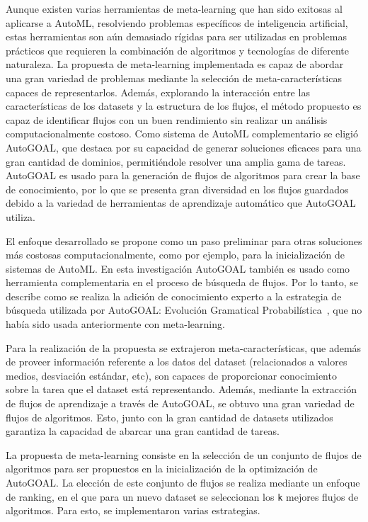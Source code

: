 \begin{conclusions}
Aunque existen varias herramientas de meta-learning que han sido exitosas al aplicarse a AutoML, resolviendo problemas específicos de inteligencia artificial, estas herramientas son aún demasiado rígidas para ser utilizadas en problemas prácticos que requieren la combinación de algoritmos y tecnologías de diferente naturaleza. La propuesta de meta-learning implementada es capaz de abordar una gran variedad de problemas mediante la selección de meta-características capaces de representarlos. Además, explorando la interacción entre las características de los datasets y la estructura de los flujos, el método propuesto es capaz de identificar flujos con un buen rendimiento sin realizar un análisis computacionalmente costoso. Como sistema de AutoML complementario se eligió AutoGOAL, que destaca por su capacidad de generar soluciones eficaces para una gran cantidad de dominios, permitiéndole resolver una amplia gama de tareas. AutoGOAL es usado para la generación de flujos de algoritmos para crear la base de conocimiento, por lo que se presenta gran diversidad en los flujos guardados debido a la variedad de herramientas de aprendizaje automático que AutoGOAL utiliza.

El enfoque desarrollado se propone como un paso preliminar para otras soluciones más costosas computacionalmente, como por ejemplo, para la inicialización de sistemas de AutoML. En esta investigación AutoGOAL también es usado como herramienta complementaria en el proceso de búsqueda de flujos. Por lo tanto, se describe como se realiza la adición de conocimiento experto a la estrategia de búsqueda utilizada por AutoGOAL: Evolución Gramatical Probabilística~\cite{pge2015}, que no había sido usada anteriormente con meta-learning.

Para la realización de la propuesta se extrajeron meta-características, que además de proveer información referente a los datos del dataset (relacionados a valores medios, desviación estándar, etc), son capaces de proporcionar conocimiento sobre la tarea que el dataset está representando. Además, mediante la extracción de flujos de aprendizaje a través de AutoGOAL, se obtuvo una gran variedad de flujos de algoritmos. Esto, junto con la gran cantidad de datasets utilizados garantiza la capacidad de abarcar una gran cantidad de tareas.

La propuesta de meta-learning consiste en la selección de un conjunto de flujos de algoritmos para ser propuestos en la inicialización de la optimización de AutoGOAL. La elección de este conjunto de flujos se realiza mediante un enfoque de ranking, en el que para un nuevo dataset se seleccionan los \texttt{k} mejores flujos de algoritmos. Para esto, se implementaron varias estrategias.


\end{conclusions}
